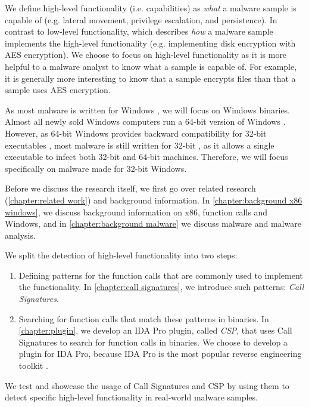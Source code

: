 We define high-level functionality (i.e. capabilities) as \emph{what} a malware sample is capable of (e.g. lateral movement, privilege escalation, and persistence). In contrast to low-level functionality, which describes \emph{how} a malware sample implements the high-level functionality (e.g. implementing disk encryption with AES encryption). We choose to focus on high-level functionality as it is more helpful to a malware analyst to know what a sample is capable of. For example, it is generally more interesting to know that a sample encrypts files than that a sample uses AES encryption.

As most malware is written for Windows \cite{windows-malware}, we will focus on Windows binaries. Almost all newly sold Windows computers run a 64-bit version of Windows \cite{64-bit-malware}. However, as 64-bit Windows provides backward compatibility for 32-bit executables \cite{wow64}, most malware is still written for 32-bit \cite{64-bit-malware}, as it allows a single executable to infect both 32-bit and 64-bit machines. Therefore, we will focus specifically on malware made for 32-bit Windows.

\medskip

Before we discuss the research itself, we first go over related research (\autoref{chapter:related work}) and background information. In \autoref{chapter:background x86 windows}, we discuss background information on x86, function calls and Windows, and in \autoref{chapter:background malware} we discuss malware and malware analysis.

\medskip

We split the detection of high-level functionality into two steps:
\begin{enumerate}
    \item Defining patterns for the function calls that are commonly used to implement the functionality. In \autoref{chapter:call signatures}, we introduce such patterns: \emph{Call Signatures}.

    \item Searching for function calls that match these patterns in binaries. In \autoref{chapter:plugin}, we develop an IDA Pro plugin, called \emph{CSP}, that uses Call Signatures to search for function calls in binaries. We choose to develop a plugin for IDA Pro, because IDA Pro is the most popular reverse engineering toolkit \cite{ida_guide}.
\end{enumerate}

\medskip

We test and showcase the usage of Call Signatures and CSP by using them to detect specific high-level functionality in real-world malware samples.

